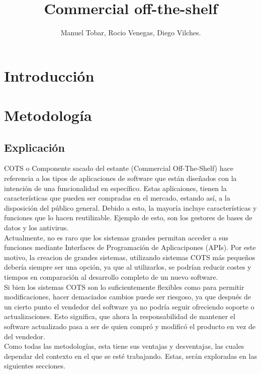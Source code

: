 \documentclass{udpreport}
\title{Commercial off-the-shelf}
\author{Manuel Tobar, Rocio Venegas, Diego Vilches.}
\begin{document}
\maketitle
\tableofcontents
\chapter{Introducción}

\chapter{Metodología}
	\section{Explicación}
	COTS o Componente sacado del estante (Commercial Off-The-Shelf) hace referencia a los tipos de aplicaciones de software que están diseñados con la intención de una funcionalidad en específico. Estas aplicaiones, tienen la características que pueden ser compradas en el mercado, estando así, a la disposición del público general. Debido a esto, la mayoría incluye características y funciones que lo hacen reutilizable. Ejemplo de esto, son los gestores de bases de datos y los antivirus.
	\\
	
	
	Actualmente, no es raro que los sistemas grandes permitan acceder a sus funciones mediante Interfaces de Programación de Aplicacipones (APIs). Por este motivo, la creacion de grandes sistemas, utilizando sistemas COTS más pequeños debería siempre ser una opción, ya que al utilizarlos, se podrían reducir costes y tiempos en comparación al desarrollo completo de un nuevo software.
	\\
	
	
	Si bien los sistemas COTS son lo suficientemente flexibles como para permitir modificaciones, hacer demaciados cambios puede ser riesgoso, ya que después de un cierto punto el vendedor del software ya no podría seguir ofreciendo soporte o actualizaciones. Esto significa, que ahora la responsabilidad de mantener el software actualizado pasa a ser de quien compró y modificó el producto en vez de del vendedor.
	\\	
	
	
	Como todas las metodologías, esta tiene sus ventajas y desventajas, las cuales dependar del contexto en el que se esté trabajando. Estas, serán exploradas en las siguientes secciones.
\end{document}

